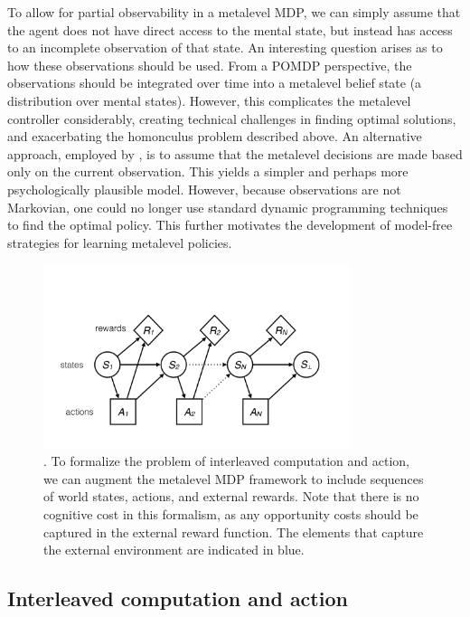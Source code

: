 To allow for partial observability in a metalevel MDP, we can simply assume that the agent does not have direct access to the mental state, but instead has access to an incomplete observation of that state. An interesting question arises as to how these observations should be used. From a POMDP perspective, the observations should be integrated over time into a metalevel belief state (a distribution over mental states). However, this complicates the metalevel controller considerably, creating technical challenges in finding optimal solutions, and exacerbating the homonculus problem described above. An alternative approach, employed by \citet{suchow2016deciding}, is to assume that the metalevel decisions are made based only on the current observation. This yields a simpler and perhaps more psychologically plausible model. However, because observations are not Markovian, one could no longer use standard dynamic programming techniques to find the optimal policy. This further motivates the development of model-free strategies for learning metalevel policies.

\begin{figure}
  \centering
  \includegraphics[width=0.8\textwidth,page=2,trim=0 100 0 50]{diagrams/metamdp.pdf}
  \caption{. To formalize the problem of interleaved computation and action, we can augment the metalevel MDP framework to include sequences of world states, actions, and external rewards. Note that there is no cognitive cost in this formalism, as any opportunity costs should be captured in the external reward function. The elements that capture the external environment are indicated in blue.
  }
  \label{fig:metamdp-joint}
\end{figure}

\subsection{Interleaved computation and action}

